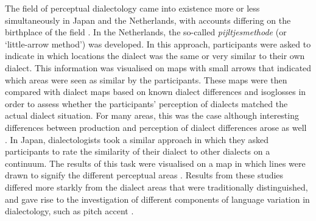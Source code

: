 \documentclass[output=paper,colorlinks,citecolor=brown,draft]{langscibook}
\begin{document}
The field of perceptual dialectology came into existence more or less simultaneously in Japan and the Netherlands, with accounts differing on the birthplace of the field \citep{montgomery_perceptual_2011}. In the Netherlands, the so-called \textit{pijltjesmethode} (or `little-arrow method') was developed. In this approach, participants were asked to indicate in which locations the dialect was the same or very similar to 
their own dialect. This information was visualised on maps with small arrows that indicated which areas were seen as similar by the participants. These maps were then compared with dialect maps based on known dialect differences and isoglosses in order to assess whether the participants' perception of dialects matched the 
actual dialect situation. For many areas, this was the case although interesting differences between production and perception of dialect differences arose as well \citep{weijnen_grenzen_1946}. In Japan, dialectologists took a similar approach in which they asked participants to rate the similarity of their dialect to other dialects on a continuum. The results of this task were visualised on a map in which lines were drawn to signify the different 
perceptual areas \citep{sibata_consciousness_1999}. Results from these studies differed more starkly from the dialect areas that were traditionally distinguished, and gave rise to the investigation of different components of language variation in dialectology, such as pitch accent \citep{montgomery_perceptual_2011}. 
\end{document}
